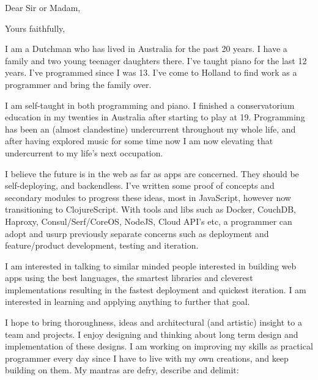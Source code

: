 \documentclass[11pt,a4paper,sans]{moderncv}        %
\begin{document}
\setcounter{page}{1}
 
\date{\today}
\opening{Dear Sir or Madam,}
\closing{Yours faithfully,}
\makelettertitle
\justify
I am a Dutchman who has lived in Australia for the past 20 years. I have a family and two young teenager daughters there. I've taught piano for the last 12 years. I've programmed since I was 13. I've come to Holland to find work as a programmer and bring the family over. 

I am self-taught in both programming and piano. I finished a conservatorium education in my twenties in Australia after starting to play at 19. Programming has been an (almost clandestine) undercurrent throughout my whole life, and after having explored music for some time now I am now elevating that undercurrent to my life's next occupation. 

I believe the future is in the web as far as apps are concerned. They should be self-deploying, and backendless. I've written some proof of concepts and secondary modules to progress these ideas, most in JavaScript, however now transitioning to ClojureScript. With tools and libs such as Docker, CouchDB, Haproxy, Consul/Serf/CoreOS, NodeJS, Cloud API's  etc, a programmer can adopt and usurp previously separate concerns such as deployment and feature/product development, testing and iteration. 

I am interested in talking to similar minded people interested in building web apps using the best languages, the smartest libraries and cleverest implementations resulting in the fastest deployment and quickest iteration. I am interested in learning and applying anything to further that goal. 

I hope to bring thoroughness, ideas and architectural (and artistic) insight to a team and projects. I enjoy designing and thinking about long term design and implementation of these designs. I am working on improving my skills as practical programmer every day since I have to live with my own creations, and keep building on them. My mantras are defry, describe and delimit:
\vspace{3mm} %
\renewcommand{\labelitemi}{\textbullet}
\end{document}
